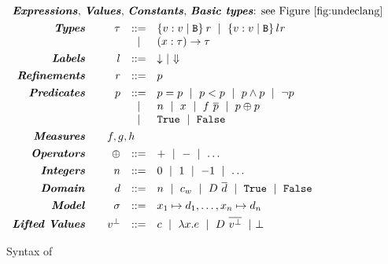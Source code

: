 
\renewcommand\restrictdecidable[2]{#1}
\newcommand\samerule[1]{}


\begin{figure}[t!]
\centering
\captionsetup{justification=centering}
$$
\begin{array}{rrcl}
\multicolumn{4}{l}{\text{\emphbf{Expressions}, \emphbf{Values}, \emphbf{Constants}, \emphbf{Basic types}:
see Figure~\ref{fig:undeclang}}} \\[0.05in]

\emphbf{Types} \quad 
  & \tau
  & ::=  
  & 	 \tref{v}{\ttbase}{}{\refi}
  \spmid \tref{v}{\ttbase}{l}{\refi}\\
  &&
  \spmid & \tfunref{x}{\tau}{\tau}{v}{\refi}   \\[0.05in]

\emphbf{Labels} \quad 
  & l
  & ::= 
  & \trivial \spmid \finite 
  \\[0.05in] 

\emphbf{Refinements} \quad 
  & \refi
  & ::=
  & p
  \\[0.05in] 

\emphbf{Predicates} \quad 
  & p
  & ::= 
  &   	 \lterm = \lterm
  \spmid \lterm < \lterm
  \spmid       p \land p
  \spmid \lnot p\\
  &&
  \spmid &   	 n 
  \spmid x 
  \spmid f \ \overline{\lterm}
  \spmid \lterm \oplus \lterm
  \\ && \spmid &
  \etrue
  \spmid \efalse 
  \\[0.05in] 

\emphbf{Measures} \quad 
  & \multicolumn{3}{l}{f,g,h}
  \\[0.05in] 
  
\emphbf{Operators} \quad 
  & \oplus
  & ::= 
  &   	 + 
  \spmid -  
  \spmid \dots
  \\[0.05in] 
  
\emphbf{Integers} \quad 
  & n
  & ::= 
  &   	 0 
  \spmid 1
  \spmid -1
  \spmid \dots
  \\[0.05in] 

\emphbf{Domain} \quad 
  & d
  & ::= 
  & n 
  \spmid c_w 
  \spmid D\ \overline{d}  
  \spmid \etrue
  \spmid \efalse
  \\[0.05in] 
  
\emphbf{Model} \quad 
  & \sigma & ::= & \gbind{x_1}{d_1},\ldots,\gbind{x_n}{d_n}
  \\[0.05in] 

\emphbf{Lifted Values} \quad 
  & \botv
  & ::= 
  &   	 c 
  \spmid \efun{x}{}{e} 
  \spmid D \ \overline{\botv}
  \spmid \ebot
\end{array}
$$
\caption{Syntax of \declang}
\label{fig:declang:syntax}
\end{figure}


